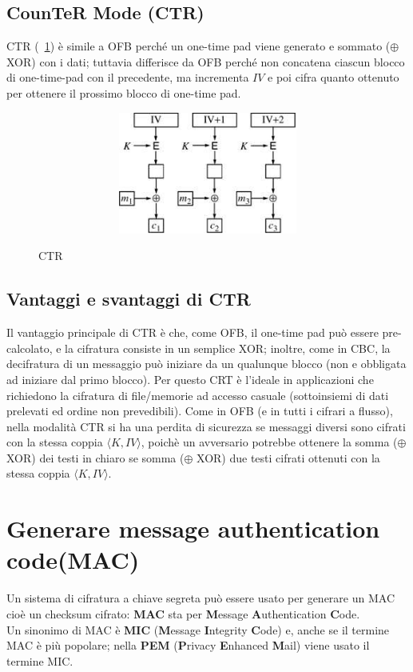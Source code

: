 \subsection{CounTeR Mode (CTR)}
CTR (\figurename ~\ref{fig:CTR}) è simile a OFB perché un one-time pad viene generato e sommato ($\oplus$ XOR) con i dati; tuttavia differisce da OFB perché non concatena ciascun blocco di one-time-pad con il precedente, ma incrementa $IV$ e poi cifra quanto ottenuto per ottenere il prossimo blocco di one-time pad. 
\begin{figure}[htbp]
	\centering%
	\subfigure%
	{\includegraphics[height=4cm, width=12cm, keepaspectratio]{Immagini/Capitolo3/CTR.png}}
	\caption{CTR \label{fig:CTR}} 	
\end{figure}
\subsection{Vantaggi e svantaggi di CTR}
Il vantaggio principale di CTR è che, come OFB, il one-time pad può essere pre-calcolato, e la cifratura consiste in un semplice XOR; inoltre, come in CBC, la decifratura di un messaggio può iniziare da un qualunque blocco (non e obbligata ad iniziare dal primo blocco). Per questo CRT è l'ideale in applicazioni che richiedono la cifratura di file/memorie ad accesso casuale (sottoinsiemi di dati prelevati ed ordine non prevedibili).\newline \newline
Come in OFB (e in tutti i cifrari a flusso), nella modalità CTR si ha una perdita di sicurezza se messaggi diversi sono cifrati con la stessa coppia $\langle K, IV \rangle$, poichè un avversario potrebbe ottenere la somma ($\oplus$ XOR) dei testi in chiaro se somma ($\oplus$ XOR) due testi cifrati ottenuti con la stessa coppia $\langle K, IV \rangle$.
\section{Generare message authentication code(MAC)}
Un sistema di cifratura a chiave segreta può essere usato per generare un MAC cioè un checksum cifrato: \textbf{MAC} sta per \textbf{M}essage \textbf{A}uthentication \textbf{C}ode. \\
Un sinonimo di MAC è \textbf{MIC} (\textbf{M}essage \textbf{I}ntegrity \textbf{C}ode) e, anche se il termine MAC è più popolare; nella \textbf{PEM} (\textbf{P}rivacy \textbf{E}nhanced \textbf{M}ail) viene usato il termine MIC.\\
\\


